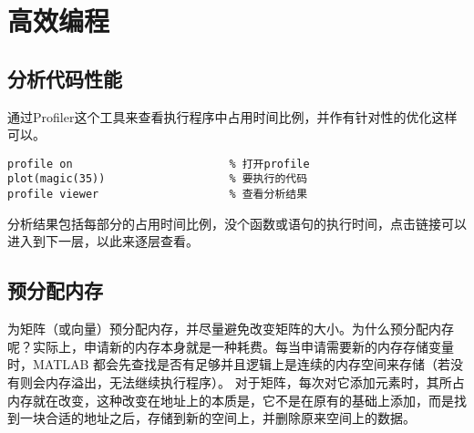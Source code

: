 \section{高效编程}

\subsection{分析代码性能}

通过Profiler这个工具来查看执行程序中占用时间比例，并作有针对性的优化这样可以。

\vspace{-0.8cm}
\begin{lstlisting}[caption = 用Profiler分析代码性能] 
profile on                        % 打开profile
plot(magic(35))                   % 要执行的代码
profile viewer                    % 查看分析结果
\end{lstlisting}

分析结果包括每部分的占用时间比例，没个函数或语句的执行时间，点击链接可以进入到下一层，以此来逐层查看。







\subsection{预分配内存}

为矩阵（或向量）预分配内存，并尽量避免改变矩阵的大小。为什么预分配内存呢？实际上，申请新的内存本身就是一种耗费。每当申请需要新的内存存储变量时，MATLAB 都会先查找是否有足够并且逻辑上是连续的内存空间来存储（若没有则会内存溢出，无法继续执行程序）。 对于矩阵，每次对它添加元素时，其所占内存就在改变，这种改变在地址上的本质是，它不是在原有的基础上添加，而是找到一块合适的地址之后，存储到新的空间上，并删除原来空间上的数据。

\vspace{-0.8cm}


\vspace{-0.8cm}






